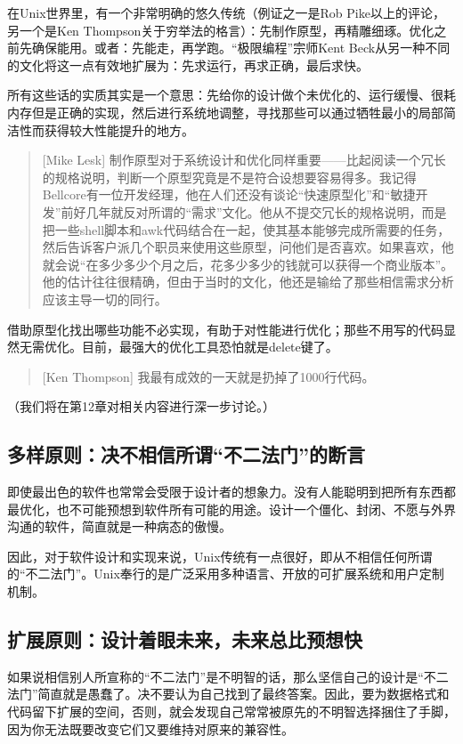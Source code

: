 \documentclass[12pt,oneside]{book}
\begin{document}
在Unix世界里，有一个非常明确的悠久传统（例证之一是Rob Pike以上的评论，另一个是Ken Thompson关于穷举法的格言）：先制作原型，再精雕细琢。优化之前先确保能用。或者：先能走，再学跑。“极限编程”宗师Kent Beck从另一种不同的文化将这一点有效地扩展为：先求运行，再求正确，最后求快。

所有这些话的实质其实是一个意思：先给你的设计做个未优化的、运行缓慢、很耗内存但是正确的实现，然后进行系统地调整，寻找那些可以通过牺牲最小的局部简洁性而获得较大性能提升的地方。

\begin{quote}[Mike Lesk]
制作原型对于系统设计和优化同样重要——比起阅读一个冗长的规格说明，判断一个原型究竟是不是符合设想要容易得多。我记得Bellcore有一位开发经理，他在人们还没有谈论“快速原型化”和“敏捷开发”前好几年就反对所谓的“需求”文化。他从不提交冗长的规格说明，而是把一些shell脚本和awk代码结合在一起，使其基本能够完成所需要的任务，然后告诉客户派几个职员来使用这些原型，问他们是否喜欢。如果喜欢，他就会说“在多少多少个月之后，花多少多少的钱就可以获得一个商业版本”。他的估计往往很精确，但由于当时的文化，他还是输给了那些相信需求分析应该主导一切的同行。
\end{quote}

借助原型化找出哪些功能不必实现，有助于对性能进行优化；那些不用写的代码显然无需优化。目前，最强大的优化工具恐怕就是delete键了。

\begin{quote}[Ken Thompson]
我最有成效的一天就是扔掉了1000行代码。
\end{quote}

（我们将在第12章对相关内容进行深一步讨论。）

\subsection{多样原则：决不相信所谓“不二法门”的断言}
即使最出色的软件也常常会受限于设计者的想象力。没有人能聪明到把所有东西都最优化，也不可能预想到软件所有可能的用途。设计一个僵化、封闭、不愿与外界沟通的软件，简直就是一种病态的傲慢。

因此，对于软件设计和实现来说，Unix传统有一点很好，即从不相信任何所谓的“不二法门”。Unix奉行的是广泛采用多种语言、开放的可扩展系统和用户定制机制。

\subsection{扩展原则：设计着眼未来，未来总比预想快}
如果说相信别人所宣称的“不二法门”是不明智的话，那么坚信自己的设计是“不二法门”简直就是愚蠢了。决不要认为自己找到了最终答案。因此，要为数据格式和代码留下扩展的空间，否则，就会发现自己常常被原先的不明智选择捆住了手脚，因为你无法既要改变它们又要维持对原来的兼容性。
\end{document}
